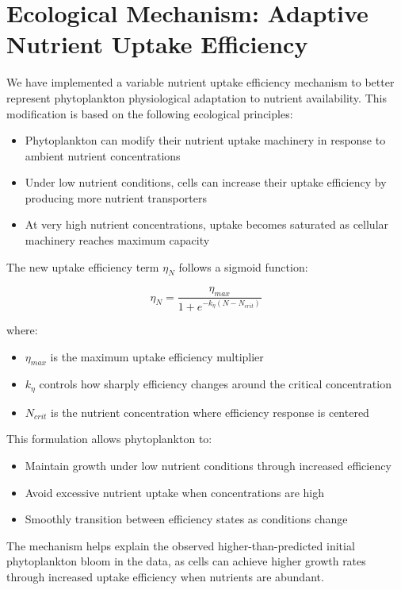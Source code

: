 \section{Ecological Mechanism: Adaptive Nutrient Uptake Efficiency}

We have implemented a variable nutrient uptake efficiency mechanism to better represent phytoplankton physiological adaptation to nutrient availability. This modification is based on the following ecological principles:

\begin{itemize}
    \item Phytoplankton can modify their nutrient uptake machinery in response to ambient nutrient concentrations
    \item Under low nutrient conditions, cells can increase their uptake efficiency by producing more nutrient transporters
    \item At very high nutrient concentrations, uptake becomes saturated as cellular machinery reaches maximum capacity
\end{itemize}

The new uptake efficiency term $\eta_N$ follows a sigmoid function:

\[ \eta_N = \frac{\eta_{max}}{1 + e^{-k_\eta(N - N_{crit})}} \]

where:
\begin{itemize}
    \item $\eta_{max}$ is the maximum uptake efficiency multiplier
    \item $k_\eta$ controls how sharply efficiency changes around the critical concentration
    \item $N_{crit}$ is the nutrient concentration where efficiency response is centered
\end{itemize}

This formulation allows phytoplankton to:
\begin{itemize}
    \item Maintain growth under low nutrient conditions through increased efficiency
    \item Avoid excessive nutrient uptake when concentrations are high
    \item Smoothly transition between efficiency states as conditions change
\end{itemize}

The mechanism helps explain the observed higher-than-predicted initial phytoplankton bloom in the data, as cells can achieve higher growth rates through increased uptake efficiency when nutrients are abundant.

